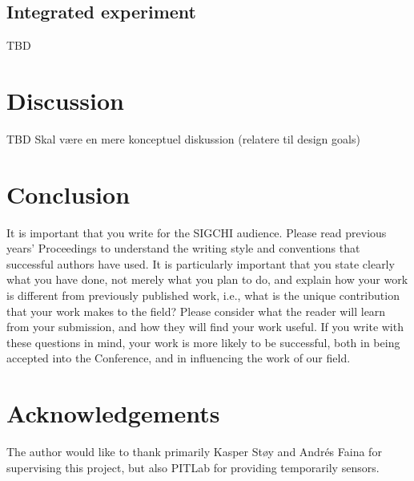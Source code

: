 \documentclass{sigchi}
\begin{document}
	\subsection{Integrated experiment}
	TBD
	
	\section{Discussion}
	TBD
	Skal være en mere konceptuel diskussion (relatere til design goals)
	
	\section{Conclusion}
	It is important that you write for the SIGCHI audience.  Please read
	previous years' Proceedings to understand the writing style and
	conventions that successful authors have used.  It is particularly
	important that you state clearly what you have done, not merely what
	you plan to do, and explain how your work is different from previously
	published work, i.e., what is the unique contribution that your work
	makes to the field?  Please consider what the reader will learn from
	your submission, and how they will find your work useful.  If you
	write with these questions in mind, your work is more likely to be
	successful, both in being accepted into the Conference, and in
	influencing the work of our field.
	
	\section{Acknowledgements}
	The author would like to thank primarily Kasper Støy and Andrés Faina for supervising this project, but also PITLab for providing temporarily sensors.
	
	
	\balance
	
	
	
\end{document}
